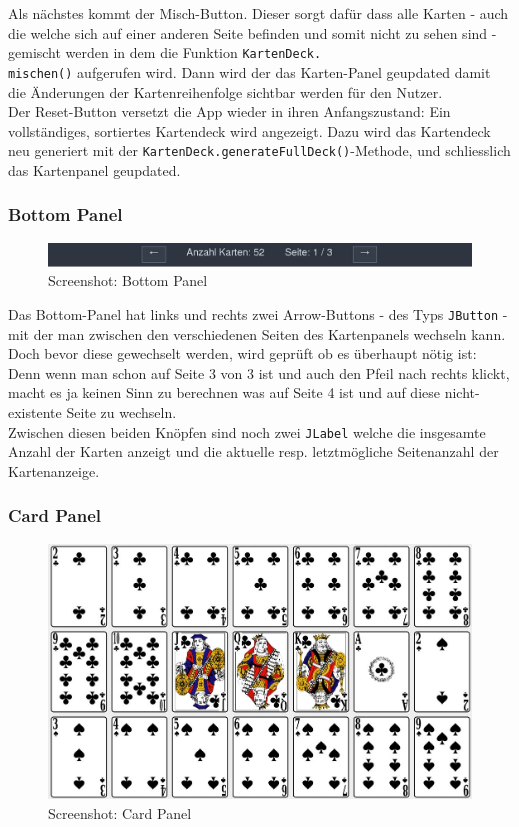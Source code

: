 \documentclass[a4paper,11pt]{article}
\begin{document}
Als nächstes kommt der Misch-Button. Dieser sorgt dafür dass alle Karten - auch die welche sich auf einer anderen Seite befinden und somit nicht zu sehen sind - gemischt werden in dem die Funktion \texttt{KartenDeck.\\mischen()} aufgerufen wird. Dann wird der das Karten-Panel geupdated damit die Änderungen der Kartenreihenfolge sichtbar werden für den Nutzer.\\

Der Reset-Button versetzt die App wieder in ihren Anfangszustand: Ein vollständiges, sortiertes Kartendeck wird angezeigt. Dazu wird das Kartendeck neu generiert mit der \texttt{KartenDeck.generateFullDeck()}-Methode, und schliesslich das Kartenpanel geupdated.

\subsubsection{Bottom Panel}
\begin{figure}[H]
    \centering
    \includegraphics[width=.9\textwidth]{media/bottom-panel.jpg}
    \caption{Screenshot: Bottom Panel}
\end{figure}

Das Bottom-Panel hat links und rechts zwei Arrow-Buttons - des Typs \texttt{JButton} - mit der man zwischen den verschiedenen Seiten des Kartenpanels wechseln kann. Doch bevor diese gewechselt werden, wird geprüft ob es überhaupt nötig ist: Denn wenn man schon auf Seite 3 von 3 ist und auch den Pfeil nach rechts klickt, macht es ja keinen Sinn zu berechnen was auf Seite 4 ist und auf diese nicht-existente Seite zu wechseln.\\

Zwischen diesen beiden Knöpfen sind noch zwei \texttt{JLabel} welche die insgesamte Anzahl der Karten anzeigt und die aktuelle resp. letztmögliche Seitenanzahl der Kartenanzeige.

\subsubsection{Card Panel}
\begin{figure}[H]
    \centering
    \includegraphics[width=.9\textwidth]{media/card-panel.jpg}
    \caption{Screenshot: Card Panel}
\end{figure}
\end{document}
